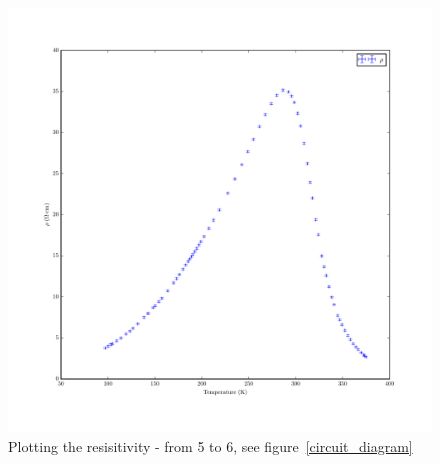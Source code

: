 \documentclass[reprint, nobibnotes, amssymb, amsmath, amsfonts, physics, mathtools, mathrsfs, floatfix]{revtex4-1}
\begin{document}
\begin{widetext}
      \begin{figure}[h]
        \centering
        \includegraphics[width=\linewidth]{../plots/rho_vs_T.pdf}
        \caption{Plotting the resisitivity - from 5 to 6, see figure~\ref{circuit_diagram} \label{rho_vs_T}}
      \end{figure}


\end{widetext}
\end{document}
